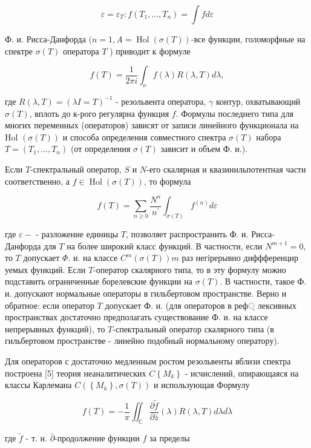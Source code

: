 \documentclass[10pt]{article}
\begin{document}
\[

\varepsilon=\varepsilon_{T}: f\left(T_{1}, \ldots, T_{n}\right)=\int f d \varepsilon

\]



Ф. и. Рисса-Данфорда $(n=1, A=\operatorname{Hol}(\sigma(T))$-все функции, голоморфные на спектре $\sigma(T)$ оператора $T$ ) приводит к формуле



\[

f(T)=\frac{1}{2 \pi i} \int_{\nu} f(\lambda) R(\lambda, T) d \lambda,

\]



где $R(\lambda, T)=(\lambda I=T)^{-1}$ - резольвента оператора, $\gamma$ контур, охватывающий $\sigma(T)$, вплоть до к-рого регулярна функция $f$. Формулы последнего типа для многих переменных (операторов) зависят от записи линейного функционала на Hol $(\sigma(T))$ и способа определения совместного спектра $\sigma(T)$ набора $T=\left(T_{1}, \ldots, T_{n}\right)$ (от определения $\sigma(T)$ зависит и объем Ф. и.).



Если $T$-спектральный оператор, $S$ и $N$-его скалярная и квазинильпотентная части соответственно, а $f \in \operatorname{Hol}(\sigma(T))$, то формула



\[

f(T)=\sum_{n \geqslant 0} \frac{N^{n}}{n^{\prime}} \int_{\sigma(T)} f^{(n)} d \varepsilon

\]



где $\varepsilon-$ - разложение единицы $T$, позволяет распространить Ф. и. Рисса-Данфорда для $T$ на более широкий класс функций. В частности, если $N^{m+1}=0$, то $T$ допускает $\Phi$. и. на классе $C^{m}(\sigma(T)) m$ раз негірерывно диффференцир уемых функций. Если $T$-оператор скалярного типа, то в эту формулу можно подставить ограниченные борелевские функции на $\sigma(T)$. В частности, такое Ф. и. допускают нормальные операторы в гильбертовом пространстве. Верно и обратное: если оператор $T$ допускает Ф. и. (для операторов в реф্ лексивных пространствах достаточно предполагать существование Ф. и. на классе непрерывных функций), то $T$-спектральный оператор скалярного типа (в гильбертовом пространстве - линейно подобный нормальному оператору).



Для операторов с достаточно медленным ростом резольвенты вблизи спектра построена [5] теория неаналитических $C\left\{M_{k}\right\}$ - исчислений, опирающаяся на классы Карлемана $C\left(\left\{M_{k}\right\}, \sigma(T)\right)$ и использующая Формулу



\[

f(T)=-\frac{1}{\pi} \iint_{\mathbb{C}} \frac{\partial \tilde{f}}{\partial \bar{z}}(\lambda) R(\lambda, T) d \lambda \overline{d \lambda}

\]



где $\tilde{f}$ - т. н. $\bar{\partial}$-продолжение функции $f$ за пределы
\end{document}
